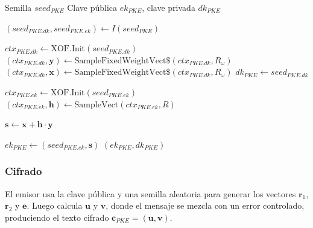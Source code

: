 \begin{tcolorbox}[hqcbox,title=\textbf{Algoritmo HQC–PKE.KeyGen}]
\begin{algorithmic}[1]
\Require Semilla $\textit{seed}_{PKE}$
\Ensure Clave pública $\textit{ek}_{PKE}$, clave privada $\textit{dk}_{PKE}$

\State $(\textit{seed}_{PKE.dk}, \textit{seed}_{PKE.ek}) \gets I(\textit{seed}_{PKE})$

\State $\textit{ctx}_{PKE.dk} \gets \text{XOF.Init}(\textit{seed}_{PKE.dk})$
\State $(\textit{ctx}_{PKE.dk}, \mathbf{y}) \gets \text{SampleFixedWeightVect\$}(\textit{ctx}_{PKE.dk}, R_\omega)$
\State $(\textit{ctx}_{PKE.dk}, \mathbf{x}) \gets \text{SampleFixedWeightVect\$}(\textit{ctx}_{PKE.dk}, R_\omega)$
\State $\textit{dk}_{PKE} \gets \textit{seed}_{PKE.dk}$

\State $\textit{ctx}_{PKE.ek} \gets \text{XOF.Init}(\textit{seed}_{PKE.ek})$
\State $(\textit{ctx}_{PKE.ek}, \mathbf{h}) \gets \text{SampleVect}(\textit{ctx}_{PKE.ek}, R)$

\State $\mathbf{s} \gets \mathbf{x} + \mathbf{h}\cdot\mathbf{y}$

\State $\textit{ek}_{PKE} \gets (\textit{seed}_{PKE.ek}, \mathbf{s})$
\State \Return $(\textit{ek}_{PKE}, \textit{dk}_{PKE})$
\end{algorithmic}
\end{tcolorbox}

\subsubsection{Cifrado}
El emisor usa la clave pública y una semilla aleatoria para generar los vectores $\mathbf{r}_1$, $\mathbf{r}_2$ y $\mathbf{e}$. Luego calcula $\mathbf{u}$ y $\mathbf{v}$, donde el mensaje se mezcla con un error controlado, produciendo el texto cifrado $\mathbf{c}_{PKE} = (\mathbf{u}, \mathbf{v})$.

